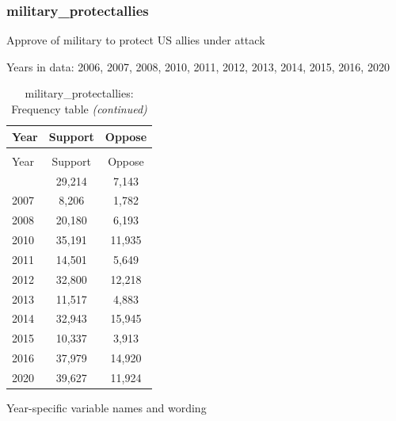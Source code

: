 \documentclass[
  12pt]{article}
\begin{document}
\hypertarget{military_protectallies}{%
\subsubsection{military\_protectallies}\label{military_protectallies}}

Approve of military to protect US allies under attack

Years in data: 2006, 2007, 2008, 2010, 2011, 2012, 2013, 2014, 2015,
2016, 2020\begingroup\fontsize{10}{12}\selectfont

\begin{longtable}[t]{lcc}
\caption{\label{tab:unnamed-chunk-5}military\_protectallies: Frequency table}\\
\toprule
Year & Support & Oppose\\
\midrule
\endfirsthead
\caption[]{military\_protectallies: Frequency table \textit{(continued)}}\\
\toprule
Year & Support & Oppose\\
\midrule
\endhead

\endfoot
\bottomrule
\endlastfoot
2006 & 29,214 & 7,143\\
2007 & 8,206 & 1,782\\
2008 & 20,180 & 6,193\\
2010 & 35,191 & 11,935\\
2011 & 14,501 & 5,649\\
2012 & 32,800 & 12,218\\
2013 & 11,517 & 4,883\\
2014 & 32,943 & 15,945\\
2015 & 10,337 & 3,913\\
2016 & 37,979 & 14,920\\
2020 & 39,627 & 11,924\\*
\end{longtable}
\endgroup{}

Year-specific variable names and
wording\begingroup\fontsize{11}{13}\selectfont
\end{document}
